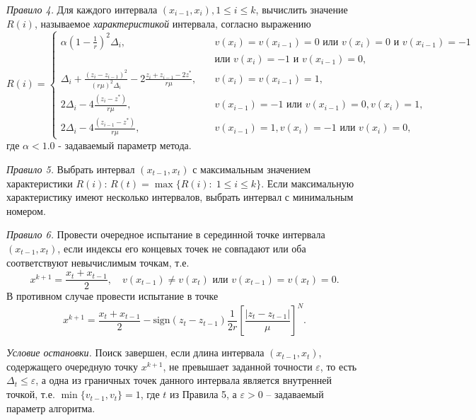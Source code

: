 \documentclass[a4paper,12pt,russian]{article}
\begin{document}
\textit{Правило 4.} Для каждого интервала $(x_{i-1},x_i),1 \leq i \leq k$, вычислить значение $R(i)$, называемое \textit{характеристикой} интервала, согласно выражению
\begin{equation}\label{eq9} 
R(i)=
  \begin{cases}
    \alpha{(1-\frac{1}{r})}^2 \Delta _i,& {\quad v(x_i)=v(x_{i-1})=0 \text{ или } v(x_i)=0 \text{ и } v(x_{i-1})=-1}\\
    {} & {\quad \text{или } v(x_i)=-1  \text{ и } v(x_{i-1})=0},\\
    \Delta _i+\frac {{(z_i-z_{i-1})}^2}{{(r \mu)}^2 \Delta _i} - 2 \frac {z_i+z_{i-1}-2z^*}{r \mu}, & {\quad  v(x_i)=v(x_{i-1})=1},\\
    2 \Delta _i-4 \frac {(z_i-z^*)}{r \mu}, & {\quad  v(x_{i-1})=-1 \text{ или } v(x_{i-1})=0, v(x_i)=1},\\
    2 \Delta _i-4 \frac {(z_{i-1}-z^*)}{r \mu}, & {\quad  v(x_{i-1})=1, v(x_i)=-1 \text{ или } v(x_i)=0,}
  \end{cases}
\end{equation}
где $\alpha < 1.0$ - задаваемый параметр метода.

\textit{Правило 5.} Выбрать интервал $(x_{t-1},x_t)$ с максимальным значением характеристики $R(i)$: $R(t)= \max\{R(i): \; 1 \leq i \leq k\}$. Если максимальную характеристику имеют несколько интервалов, выбрать интервал %
с минимальным номером.

\textit{Правило 6.} Провести очередное испытание в серединной точке интервала $(x_{t-1},x_t)$, если индексы его концевых точек не совпадают или оба соответствуют невычислимым точкам, т.е.
\begin{equation}\label{eq10} 
x^{k+1}=\frac {x_t+x_{t-1}}{2},\quad v(x_{t-1})\neq v(x_t) \text{ или } v(x_{t-1})=v(x_t)=0.
\end{equation}
В противном случае провести испытание в точке 
\begin{equation}\label{eq11} 
x^{k+1}= \frac {x_t+x_{t-1}}{2} -  \text{sign} {(z_t-z_{t-1})} \frac{1}{2r} \left[\frac {{|z_t-z_{t-1}|}}{\mu} \right]^N.
\end{equation}

\textit{Условие остановки.} Поиск завершен, если длина интервала $(x_{t-1},x_t)$, содержащего очередную точку $x^{k+1}$, не превышает заданной точности $\varepsilon$, то есть $\Delta _t \leq \varepsilon$, а одна из граничных точек данного интервала является внутренней точкой, т.е. $\min{\{v_{t-1}, v_t\}} = 1$, где $t$ из Правила 5, а $\varepsilon>0$ -- задаваемый параметр алгоритма.
\end{document}
